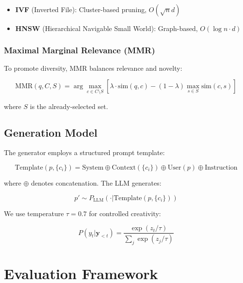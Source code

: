 \documentclass[11pt,a4paper]{article}
\newcommand{\simfunc}{\text{sim}}
\begin{document}
\begin{itemize}
    \item \textbf{IVF} (Inverted File): Cluster-based pruning, $O(\sqrt{n}d)$
    \item \textbf{HNSW} (Hierarchical Navigable Small World): Graph-based, $O(\log n \cdot d)$
\end{itemize}

\subsubsection{Maximal Marginal Relevance (MMR)}

To promote diversity, MMR balances relevance and novelty:

\begin{equation}
\text{MMR}(q, C, S) = \arg\max_{c \in C \setminus S} \left[\lambda \cdot \simfunc(q, c) - (1-\lambda) \max_{s \in S} \simfunc(c, s)\right]
\end{equation}

where $S$ is the already-selected set.

\subsection{Generation Model}

The generator employs a structured prompt template:

\begin{equation}
\text{Template}(p, \{c_i\}) = \text{System} \oplus \text{Context}(\{c_i\}) \oplus \text{User}(p) \oplus \text{Instruction}
\end{equation}

where $\oplus$ denotes concatenation. The LLM generates:

\begin{equation}
p' \sim P_{\text{LLM}}(\cdot | \text{Template}(p, \{c_i\}))
\end{equation}

We use temperature $\tau = 0.7$ for controlled creativity:

\begin{equation}
P(y_t | \mathbf{y}_{<t}) = \frac{\exp(z_t / \tau)}{\sum_j \exp(z_j / \tau)}
\end{equation}

\section{Evaluation Framework}
\label{sec:evaluation}
\end{document}
